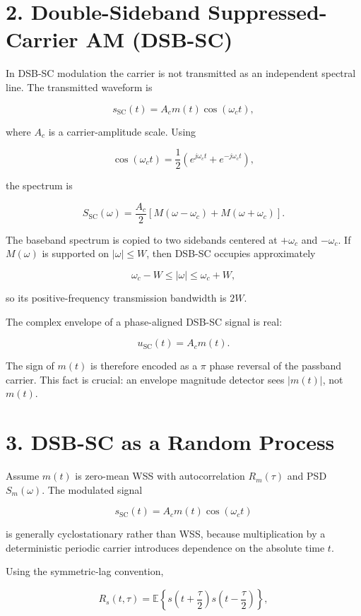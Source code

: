 \documentclass[11pt]{article}
\begin{document}
\section{2. Double-Sideband Suppressed-Carrier AM (DSB-SC)}

In DSB-SC modulation the carrier is not transmitted as an independent spectral line. The transmitted waveform is

\[
s_{\mathrm{SC}}(t)=A_c m(t)\cos(\omega_c t),
\]

where $A_c$ is a carrier-amplitude scale. Using

\[
\cos(\omega_c t)=\frac{1}{2}\left(e^{j\omega_c t}+e^{-j\omega_c t}\right),
\]

the spectrum is

\[
S_{\mathrm{SC}}(\omega)
=\frac{A_c}{2}\left[M(\omega-\omega_c)+M(\omega+\omega_c)\right].
\]

The baseband spectrum is copied to two sidebands centered at $+\omega_c$ and $-\omega_c$. If $M(\omega)$ is supported on $|\omega|\leq W$, then DSB-SC occupies approximately

\[
\omega_c-W \leq |\omega| \leq \omega_c+W,
\]

so its positive-frequency transmission bandwidth is $2W$.

The complex envelope of a phase-aligned DSB-SC signal is real:

\[
u_{\mathrm{SC}}(t)=A_c m(t).
\]

The sign of $m(t)$ is therefore encoded as a $\pi$ phase reversal of the passband carrier. This fact is crucial: an envelope magnitude detector sees $|m(t)|$, not $m(t)$.

\section{3. DSB-SC as a Random Process}

Assume $m(t)$ is zero-mean WSS with autocorrelation $R_m(\tau)$ and PSD $S_m(\omega)$. The modulated signal

\[
s_{\mathrm{SC}}(t)=A_c m(t)\cos(\omega_c t)
\]

is generally cyclostationary rather than WSS, because multiplication by a deterministic periodic carrier introduces dependence on the absolute time $t$.

Using the symmetric-lag convention,

\[
R_s(t,\tau)=\mathbb{E}\left\{s\left(t+\frac{\tau}{2}\right)s\left(t-\frac{\tau}{2}\right)\right\},
\]
\end{document}
